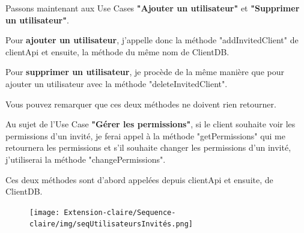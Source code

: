 \begin{flushleft}
Passons maintenant aux Use Cases \textbf{"Ajouter un utilisateur"} et \textbf{"Supprimer un utilisateur"}.
\end{flushleft}

\begin{flushleft}
Pour \textbf{ajouter un utilisateur}, j'appelle donc la méthode "addInvitedClient" de clientApi et ensuite, la méthode du même nom de ClientDB.
\end{flushleft}

\begin{flushleft}
Pour \textbf{supprimer un utilisateur}, je procède de la même manière que pour ajouter un utilisateur avec la méthode "deleteInvitedClient".
\end{flushleft}

\begin{flushleft}
Vous pouvez remarquer que ces deux méthodes ne doivent rien retourner.
\end{flushleft}

\begin{flushleft}
Au sujet de l'Use Case \textbf{"Gérer les permissions"}, si le client souhaite voir les permissions d'un invité, je ferai appel à la méthode "getPermissions" qui me retournera les permissions et s'il souhaite changer les permissions d'un invité, j'utiliserai la méthode "changePermissions".
\end{flushleft}

\begin{flushleft}
Ces deux méthodes sont d'abord appelées depuis clientApi et ensuite, de ClientDB.
\end{flushleft}

\newpage
\begin{figure}[h]
\centering
\texttt{[image: Extension-claire/Sequence-claire/img/seqUtilisateursInvités.png]}
\end{figure}